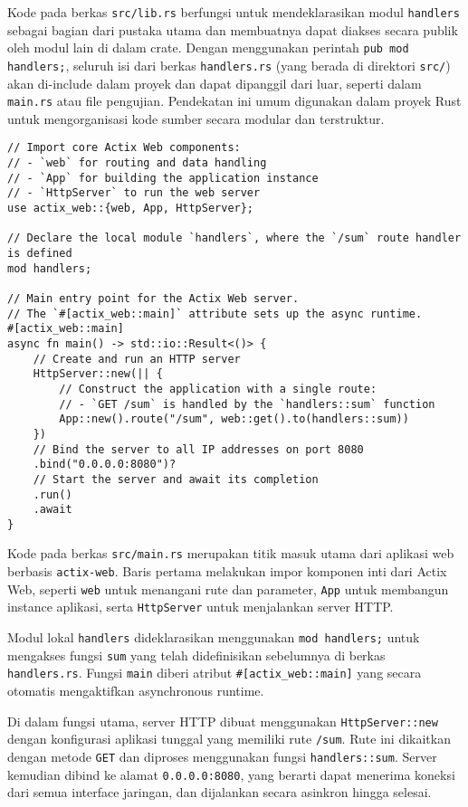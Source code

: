 Kode pada berkas \texttt{src/lib.rs} berfungsi untuk mendeklarasikan modul \texttt{handlers} sebagai bagian dari pustaka utama dan membuatnya dapat diakses secara publik oleh modul lain di dalam crate. Dengan menggunakan perintah \texttt{pub mod handlers;}, seluruh isi dari berkas \texttt{handlers.rs} (yang berada di direktori \texttt{src/}) akan di-include dalam proyek dan dapat dipanggil dari luar, seperti dalam \texttt{main.rs} atau file pengujian. Pendekatan ini umum digunakan dalam proyek Rust untuk mengorganisasi kode sumber secara modular dan terstruktur.


\begin{lstlisting}[style=RustStyle, caption={src/main.rs}]
// Import core Actix Web components:
// - `web` for routing and data handling
// - `App` for building the application instance
// - `HttpServer` to run the web server
use actix_web::{web, App, HttpServer};

// Declare the local module `handlers`, where the `/sum` route handler is defined
mod handlers;

// Main entry point for the Actix Web server.
// The `#[actix_web::main]` attribute sets up the async runtime.
#[actix_web::main]
async fn main() -> std::io::Result<()> {
	// Create and run an HTTP server
	HttpServer::new(|| {
		// Construct the application with a single route:
		// - `GET /sum` is handled by the `handlers::sum` function
		App::new().route("/sum", web::get().to(handlers::sum))
	})
	// Bind the server to all IP addresses on port 8080
	.bind("0.0.0.0:8080")?
	// Start the server and await its completion
	.run()
	.await
}

\end{lstlisting}

Kode pada berkas \texttt{src/main.rs} merupakan titik masuk utama dari aplikasi web berbasis \texttt{actix-web}. Baris pertama melakukan impor komponen inti dari Actix Web, seperti \texttt{web} untuk menangani rute dan parameter, \texttt{App} untuk membangun instance aplikasi, serta \texttt{HttpServer} untuk menjalankan server HTTP.

Modul lokal \texttt{handlers} dideklarasikan menggunakan \texttt{mod handlers;} untuk mengakses fungsi \texttt{sum} yang telah didefinisikan sebelumnya di berkas \texttt{handlers.rs}. Fungsi \texttt{main} diberi atribut \texttt{\#[actix\_web::main]} yang secara otomatis mengaktifkan asynchronous runtime.

Di dalam fungsi utama, server HTTP dibuat menggunakan \texttt{HttpServer::new} dengan konfigurasi aplikasi tunggal yang memiliki rute \texttt{/sum}. Rute ini dikaitkan dengan metode \texttt{GET} dan diproses menggunakan fungsi \texttt{handlers::sum}. Server kemudian dibind ke alamat \texttt{0.0.0.0:8080}, yang berarti dapat menerima koneksi dari semua interface jaringan, dan dijalankan secara asinkron hingga selesai.



